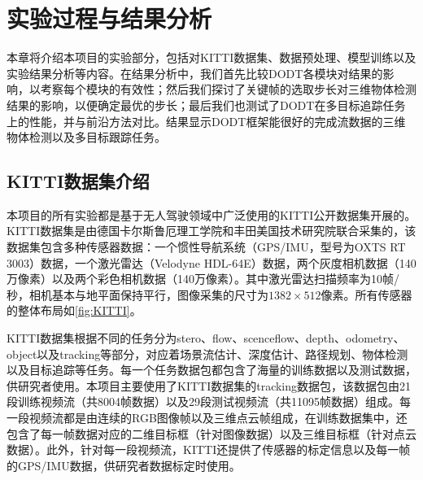 
\chapter{实验过程与结果分析}
\label{experiment}
本章将介绍本项目的实验部分，包括对KITTI数据集、数据预处理、模型训练以及实验结果分析等内容。在结果分析中，我们首先比较DODT各模块对结果的影响，以考察每个模块的有效性；然后我们探讨了关键帧的选取步长对三维物体检测结果的影响，以便确定最优的步长；最后我们也测试了DODT在多目标追踪任务上的性能，并与前沿方法对比。结果显示DODT框架能很好的完成流数据的三维物体检测以及多目标跟踪任务。

\section{KITTI数据集介绍}
\label{kitti}
本项目的所有实验都是基于无人驾驶领域中广泛使用的KITTI公开数据集开展的。KITTI数据集是由德国卡尔斯鲁厄理工学院和丰田美国技术研究院联合采集的，该数据集包含多种传感器数据：一个惯性导航系统（GPS/IMU，型号为OXTS RT 3003）数据，一个激光雷达（Velodyne HDL-64E）数据，两个灰度相机数据（140万像素）以及两个彩色相机数据（140万像素）。其中激光雷达扫描频率为10帧/秒，相机基本与地平面保持平行，图像采集的尺寸为$1382 \times 512$像素。所有传感器的整体布局如\figurename \ref{fig:KITTI}。



KITTI数据集根据不同的任务分为stero、flow、scenceflow、depth、odometry、object以及tracking等部分，对应着场景流估计、深度估计、路径规划、物体检测以及目标追踪等任务。每一个任务数据包都包含了海量的训练数据以及测试数据，供研究者使用。本项目主要使用了KITTI数据集的tracking数据包，该数据包由21段训练视频流（共8004帧数据）以及29段测试视频流（共11095帧数据）组成。每一段视频流都是由连续的RGB图像帧以及三维点云帧组成，在训练数据集中，还包含了每一帧数据对应的二维目标框（针对图像数据）以及三维目标框（针对点云数据）。此外，针对每一段视频流，KITTI还提供了传感器的标定信息以及每一帧的GPS/IMU数据，供研究者数据标定时使用。


